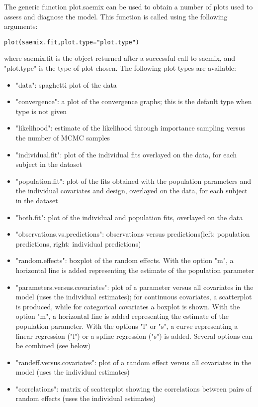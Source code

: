 The generic function {\sf plot.saemix} can be used to obtain a number of plots used to assess and diagnose the model. This function is called using the following arguments:
\begin{verbatim}
plot(saemix.fit,plot.type="plot.type")
\end{verbatim}
where {\sf saemix.fit} is the object returned after a successful call to {\sf saemix}, and {\sf "plot.type"} is the type of plot chosen. The following plot types are available:
\begin{itemize}
\item "data": spaghetti plot of the data
\item "convergence": a plot of the convergence graphs; this is the default type when {\sf type} is not given
\item "likelihood": estimate of the likelihood through importance sampling versus the number of MCMC samples
\item "individual.fit": plot of the individual fits overlayed on the data, for each subject in the dataset
\item "population.fit": plot of the fits obtained with the population parameters and the individual covariates and design, overlayed on the data, for each subject in the dataset%
\item "both.fit": plot of the individual and population fits, overlayed on the data %
\item "observations.vs.predictions": observations versus predictions(left: population predictions, right: individual predictions)
\item "random.effects": boxplot of the random effects. With the option "m", a horizontal line is added representing the estimate of the population parameter
\item "parameters.versus.covariates": plot of a parameter versus all covariates in the model (uses the individual estimates); for continuous covariates, a scatterplot is produced, while for categorical covariates a boxplot is shown. With the option "m", a horizontal line is added representing the estimate of the population parameter. With the options "l" or "s", a curve representing a linear regression ("l") or a spline regression ("s") is added. Several options can be combined (see below) %
\item "randeff.versus.covariates": plot of a random effect versus all covariates in the model (uses the individual estimates) %
\item "correlations": matrix of scatterplot showing the correlations between pairs of random effects (uses the individual estimates)

\end{itemize}
